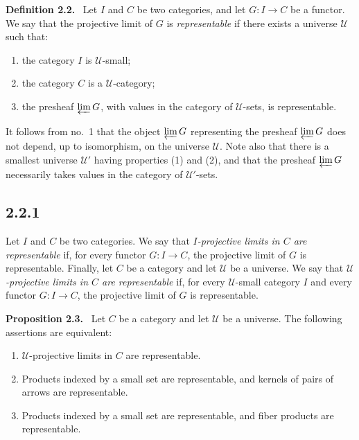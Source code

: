 \documentclass[11pt]{article}
\newcommand{\U}{\mathcal{U}}
\newenvironment{statement}[1]{\par\medskip\noindent\textbf{#1.}\ }{\par\medskip}
\begin{document}
\begin{statement}{Definition 2.2}
Let $I$ and $C$ be two categories, and let $G:I\to C$ be a functor. We say that the projective limit of $G$ is \emph{representable} if there exists a universe $\U$ such that:
\begin{enumerate}[label=\arabic*)]
\item the category $I$ is $\U$-small;
\item the category $C$ is a $\U$-category;
\item the presheaf $\varprojlim G$, with values in the category of $\U$-sets, is representable.
\end{enumerate}
\end{statement}

It follows from no.~1 that the object $\varprojlim G$ representing the presheaf $\varprojlim G$ does not depend, up to isomorphism, on the universe $\U$. Note also that there is a smallest universe $\U'$ having properties (1) and (2), and that the presheaf $\varprojlim G$ necessarily takes values in the category of $\U'$-sets.

\subsection*{2.2.1}
Let $I$ and $C$ be two categories. We say that \emph{$I$-projective limits in $C$ are representable} if, for every functor $G:I\to C$, the projective limit of $G$ is representable. Finally, let $C$ be a category and let $\U$ be a universe. We say that \emph{$\U$-projective limits in $C$ are representable} if, for every $\U$-small category $I$ and every functor $G:I\to C$, the projective limit of $G$ is representable.

\begin{statement}{Proposition 2.3}
Let $C$ be a category and let $\U$ be a universe. The following assertions are equivalent:
\begin{enumerate}[label=\roman*)]
\item $\U$-projective limits in $C$ are representable.
\item Products indexed by a small set are representable, and kernels of pairs of arrows are representable.
\item Products indexed by a small set are representable, and fiber products are representable.
\end{enumerate}
\end{statement}
\end{document}
